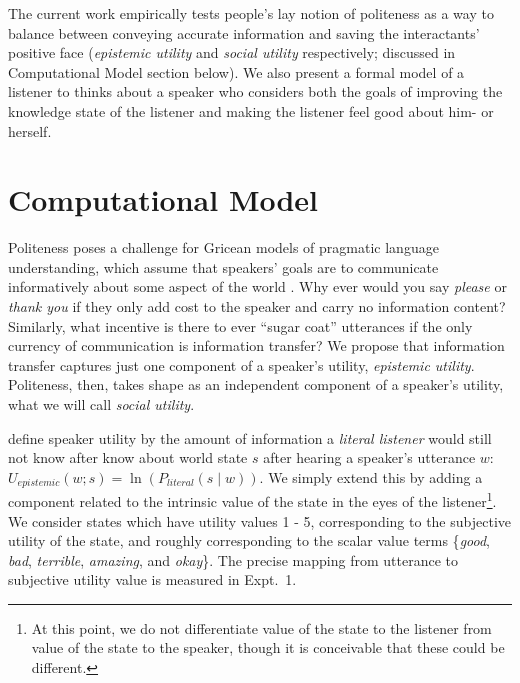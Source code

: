 \documentclass[10pt,letterpaper]{article}
\begin{document}
The current work empirically tests people's lay notion of politeness as a way to balance between conveying accurate information and saving the interactants' positive face (\emph{epistemic utility} and \emph{social utility} respectively; discussed in Computational Model section below). We also present a formal model of a listener to thinks about a speaker who considers both the goals of improving the knowledge state of the listener and making the listener feel good about him- or herself. 


\section{Computational Model}

Politeness poses a challenge for Gricean models of pragmatic language understanding, which assume that speakers' goals are to communicate informatively about some aspect of the world \cite{Frank2012, Goodman2013}. 
Why ever would you say \emph{please} or \emph{thank you} if they only add cost to the speaker and carry no information content?
Similarly, what incentive is there to ever ``sugar coat'' utterances if the only currency of communication is information transfer? 
We propose that information transfer captures just one component of a speaker's utility, \emph{epistemic utility}.
Politeness, then, takes shape as an independent component of a speaker's utility, what we will call \emph{social utility}. 

 define speaker utility by the amount of information a \emph{literal listener} would still not know after know about world state $s$ after hearing a speaker's utterance $w$: 
$U_{epistemic}(w; s) = \ln(P_{literal}(s \mid w)) $.
We simply extend this by adding a component related to the intrinsic value of the state in the eyes of the listener\footnote{At this point, we do not differentiate value of the state to the listener from value of the state to the speaker, though it is conceivable that these could be different.}.
We consider states which have utility values 1 - 5, corresponding to the subjective utility of the state, and roughly corresponding to the scalar value terms \{\emph{good}, \emph{bad}, \emph{terrible}, \emph{amazing}, and \emph{okay}\}. 
The precise mapping from utterance to subjective utility value is measured in Expt.~1.
\end{document}
